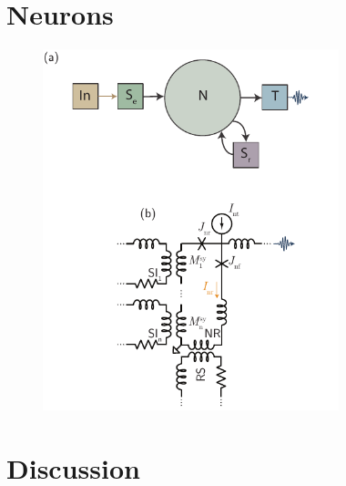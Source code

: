 \documentclass[twocolumn]{article}
\begin{document}
\section{\label{sec:neurons}Neurons}

\begin{figure}[h!]
\includegraphics[width=8.6cm]{figures/_fig__point_neuron__schematic__circuit.pdf}
\end{figure}

\section{\label{sec:discussion}Discussion}





\end{document}
